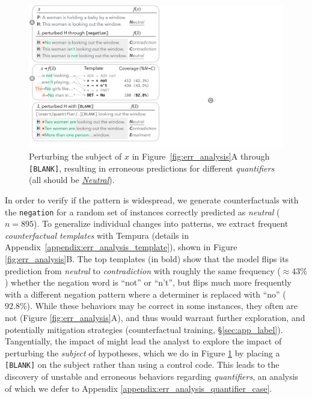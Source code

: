 \begin{figure}[t]
\centering
\includegraphics[trim={0.5cm 1.5cm 32.5cm 25.5cm}, clip,width=1\columnwidth]{figures/err_analysis.pdf}
\vspace{-15pt}
\caption{
Perturbing the subject of $x$ in Figure~\ref{fig:err_analysis}A through \texttt{[BLANK]}, resulting in erroneous predictions for different \emph{quantifiers}
(all should be \uline{\emph{Neutral}}). 
}
\vspace{-5pt}
\label{fig:err_analysis_quantifier}
\end{figure}

In order to verify if the pattern is widespread, we generate counterfactuals with the \texttt{negation} \tagstr for a random set of instances correctly predicted as \emph{neutral} ($n=895$). To generalize individual changes into patterns, we extract frequent \emph{counterfactual templates} with Tempura \cite{wu2020tempura} (details in Appendix~\ref{appendix:err_analysis_template}), shown in Figure \ref{fig:err_analysis}B.
The top templates (in bold) show that the model flips its prediction from \emph{neutral} to \emph{contradiction} with roughly the same frequency (${\approx}43\%$) whether the negation word is ``not'' or ``n't'', but flips much more frequently with a different negation pattern where a determiner is replaced with ``no'' ($92.8\%$). While these behaviors may be correct in some instances, they often are not (\eg Figure \ref{fig:err_analysis}A), and thus would warrant further exploration, and potentially mitigation strategies (\eg counterfactual training, \S\ref{sec:app_label}).
Tangentially, the impact of  might lead the analyst to explore the impact of perturbing the \emph{subject} of hypotheses, which we do in Figure \ref{fig:err_analysis_quantifier} by placing a \texttt{[BLANK]} on the subject rather than using a control code.
This leads to the discovery of unstable and erroneous behaviors regarding \emph{quantifiers}, an analysis of which we defer to Appendix \ref{appendix:err_analysis_quantifier_case}.

